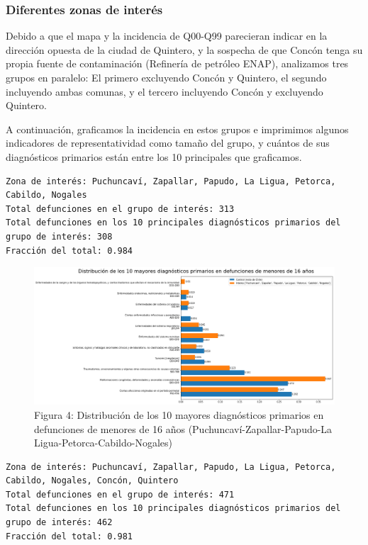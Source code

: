 \documentclass[]{article}
\begin{document}
\hypertarget{diferentes-zonas-de-interuxe9s}{%
\subsubsection{Diferentes zonas de
interés}\label{diferentes-zonas-de-interuxe9s}}

Debido a que el mapa y la incidencia de Q00-Q99 parecieran indicar en la
dirección opuesta de la ciudad de Quintero, y la sospecha de que Concón
tenga su propia fuente de contaminación (Refinería de petróleo ENAP),
analizamos tres grupos en paralelo: El primero excluyendo Concón y
Quintero, el segundo incluyendo ambas comunas, y el tercero incluyendo
Concón y excluyendo Quintero.

A continuación, graficamos la incidencia en estos grupos e imprimimos
algunos indicadores de representatividad como tamaño del grupo, y
cuántos de sus diagnósticos primarios están entre los 10 principales que
graficamos.

\begin{verbatim}
Zona de interés: Puchuncaví, Zapallar, Papudo, La Ligua, Petorca, Cabildo, Nogales
Total defunciones en el grupo de interés: 313
Total defunciones en los 10 principales diagnósticos primarios del grupo de interés: 308
Fracción del total: 0.984
\end{verbatim}

\begin{figure}
\centering
\includegraphics{assets/10-diagnosticos-(Puchuncavi-Zapallar-Papudo-LaLigua-Petorca-Cabildo-Nogales).png}
\caption{Figura 4: Distribución de los 10 mayores diagnósticos primarios en defunciones de menores de 16 años (Puchuncaví-Zapallar-Papudo-La Ligua-Petorca-Cabildo-Nogales)}
\end{figure}

\begin{verbatim}
Zona de interés: Puchuncaví, Zapallar, Papudo, La Ligua, Petorca, Cabildo, Nogales, Concón, Quintero
Total defunciones en el grupo de interés: 471
Total defunciones en los 10 principales diagnósticos primarios del grupo de interés: 462
Fracción del total: 0.981
\end{verbatim}
\end{document}
